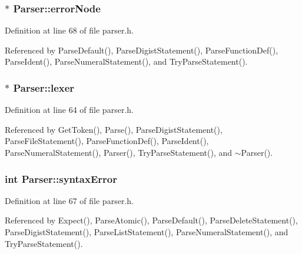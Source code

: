 \subsubsection[{\texorpdfstring{error\+Node}{errorNode}}]{$\ast$ Parser\+::error\+Node\hspace{0.3cm}{\ttfamily [private]}}\hypertarget{classParser_ab482ff79113ad2f1ef60bc6dd18528d1}{}\label{classParser_ab482ff79113ad2f1ef60bc6dd18528d1}


Definition at line 68 of file parser.\+h.



Referenced by Parse\+Default(), Parse\+Digist\+Statement(), Parse\+Function\+Def(), Parse\+Ident(), Parse\+Numeral\+Statement(), and Try\+Parse\+Statement().

\subsubsection[{\texorpdfstring{lexer}{lexer}}]{$\ast$ Parser\+::lexer\hspace{0.3cm}{\ttfamily [private]}}\hypertarget{classParser_a8a8214126b0b0455e3ce375f3e9b20bf}{}\label{classParser_a8a8214126b0b0455e3ce375f3e9b20bf}


Definition at line 64 of file parser.\+h.



Referenced by Get\+Token(), Parse(), Parse\+Digist\+Statement(), Parse\+File\+Statement(), Parse\+Function\+Def(), Parse\+Ident(), Parse\+Numeral\+Statement(), Parser(), Try\+Parse\+Statement(), and $\sim$\+Parser().

\subsubsection[{\texorpdfstring{syntax\+Error}{syntaxError}}]{\setlength{\rightskip}{0pt plus 5cm}int Parser\+::syntax\+Error\hspace{0.3cm}{\ttfamily [private]}}\hypertarget{classParser_ae50a199b804c9f5e8342a4d0a1ae6a95}{}\label{classParser_ae50a199b804c9f5e8342a4d0a1ae6a95}


Definition at line 67 of file parser.\+h.



Referenced by Expect(), Parse\+Atomic(), Parse\+Default(), Parse\+Delete\+Statement(), Parse\+Digist\+Statement(), Parse\+List\+Statement(), Parse\+Numeral\+Statement(), and Try\+Parse\+Statement().

